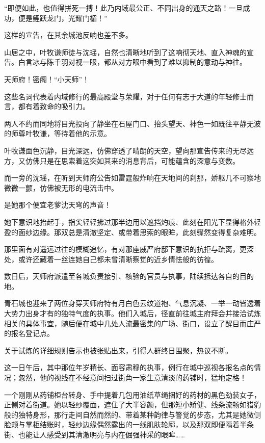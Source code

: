 “即便如此，也值得拼死一搏！此乃内域最公正、不同出身的通天之路！一旦成功，便是鲤跃龙门，光耀门楣！”

这样的宣告，在其余城池反响也差不多。

山居之中，叶牧谦师徒与沈瑶，自然也清晰地听到了这响彻天地、直入神魂的宣告。白言冰与陈千羽对视一眼，都从对方眼中看到了难以抑制的意动与神往。

天师府！密阁！“小天师”！

这些名词代表着内域修行的最高殿堂与荣耀，对于任何有志于大道的年轻修士而言，都有着致命的吸引力。

两人不约而同地将目光投向了静坐在石屋门口、抬头望天、神色一如既往平静无波的师尊叶牧谦，等待着他的示意。

叶牧谦面色沉静，目光深远，仿佛穿透了晴朗的天空，望向那宣告传来的无尽远方，又仿佛只是在思索着这突如其来的消息背后，可能蕴含的深意与变数。

而一旁的沈瑶，在听到天师府公告如雷霆般炸响在天地间的刹那，娇躯几不可察地微微一颤，仿佛被无形的电流击中。

是她那个便宜老爹沈天穹的声音！

她下意识地抬起手，指尖轻轻拂过那半边用以遮挡灼痕、此刻在阳光下显得格外轻盈的面纱边缘。那双总是清澈坚定、或带着思索的眼眸，此刻骤然变得复杂难明。

那里面有对遥远过往的模糊追忆，有对那座威严府邸下意识的抗拒与疏离，更深处，或许还藏着一丝连她自己都未曾清晰察觉的近乡情怯般的彷徨。

\vspace{2em}

数日后，天师府派遣至各城负责接引、核验的官员与执事，陆续抵达各自的目的地。

青石城也迎来了两位身穿天师府特有月白色云纹道袍、气息沉凝、一举一动皆透着大势力出身才有的独特气度的执事。他们入城后，径直前往城主府拜会并接洽试炼相关的具体事宜，随后便在城中几处人流最密集的广场、街口，设立了醒目而庄严的报名登记点。

关于试炼的详细规则告示也被张贴出来，引得人群终日围聚，热议不断。

\vspace{2em}

这一日午后，其中那位年岁稍长、面容肃穆的执事，例行在城中巡视各报名点的情况；忽然，他的视线在不经意间扫过街角一家生意清淡的药铺时，猛地定格！

一个刚刚从药铺柜台转身、手中提着几包用油纸草绳捆好的药材的黑色劲装女子，正侧对着街道。她以轻纱覆面，遮住了大半容颜，但那短小矫健、线条流畅如猎豹般的独特身形，那行走间自然而然的、带着某种韵律与警觉的步态，尤其是她微侧脸颊与掌柜结账时，轻纱边缘偶然露出的一线肌肤轮廓，以及那双即便隔着半条街、也能让人感受到其清澈明亮与内在倔强神采的眼眸……

